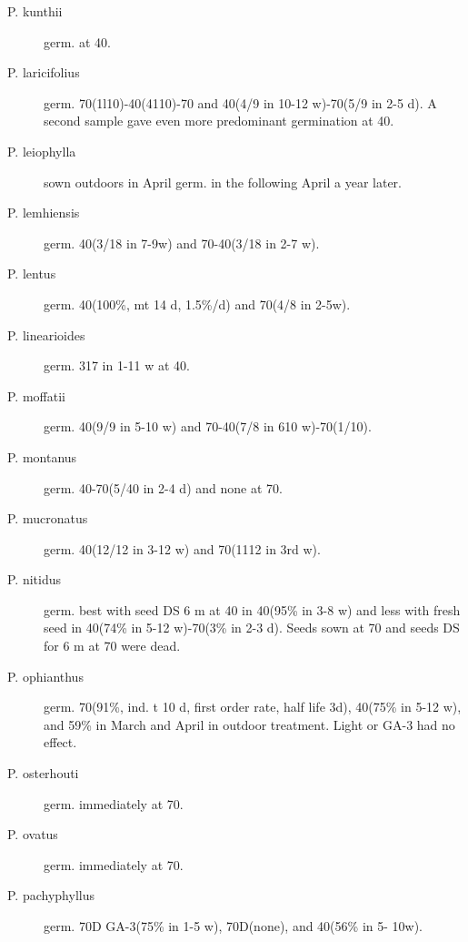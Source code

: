 \begin{description}
\item[P. kunthii] germ. at 40.
\item[P. laricifolius] germ. 70(1l10)-40(4110)-70 and 40(4/9 in 10-12 w)-70(5/9 in 2-5
d). A second sample gave even more predominant germination at 40.
\item[P. leiophylla] sown outdoors in April germ. in the following April a year later.
\item[P. lemhiensis] germ. 40(3/18 in 7-9w) and 70-40(3/18 in 2-7 w).
\item[P. lentus] germ. 40(100\%, mt 14 d, 1.5\%/d) and 70(4/8 in 2-5w).
\item[P. linearioides] germ. 317 in 1-11 w at 40.
\item[P. moffatii] germ. 40(9/9 in 5-10 w) and 70-40(7/8 in 610 w)-70(1/10).
\item[P. montanus] germ. 40-70(5/40 in 2-4 d) and none at 70.
\item[P. mucronatus] germ. 40(12/12 in 3-12 w) and 70(1112 in 3rd w).
\item[P. nitidus] germ. best with seed DS 6 m at 40 in 40(95\% in 3-8 w) and less with
fresh seed in 40(74\% in 5-12 w)-70(3\% in 2-3 d). Seeds sown at 70 and seeds DS for
6 m at 70 were dead.
\item[P. ophianthus] germ. 70(91\%, ind. t 10 d, first order rate, half life 3d), 40(75\% in
5-12 w), and 59\% in March and April in outdoor treatment. Light or GA-3 had no effect.
\item[P. osterhouti] germ. immediately at 70.
\item[P. ovatus] germ. immediately at 70.
\item[P. pachyphyllus] germ. 70D GA-3(75\% in 1-5 w), 70D(none), and 40(56\% in 5-
10w).


\end{description}
